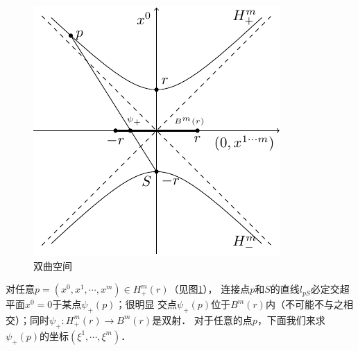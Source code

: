\begin{figure}[htb]
    \centering
    \includegraphics{fig/ch10-Hyperbolic.pdf}
    \caption{双曲空间}\label{chsm:pic_Hyperbolic}
\end{figure}

对任意$p=(x^0,x^1 ,\cdots,x^{m} )\in H^m_{+}(r)$（见图\ref{chsm:pic_Hyperbolic}），
连接点$p$和$S$的直线$l_{pS}$必定交超平面$x^{0}=0$于某点$\psi_{+}(p)$；很明显
交点$\psi_{+}(p)$位于$B^m(r)$内（不可能不与之相交）；同时$\psi_{+}:H^m_{+}(r)\to B^m(r)$是双射．
对于任意的点$p$，下面我们来求$\psi_{+}(p)$的坐标$(\xi^1,\cdots,\xi^{m})$．

